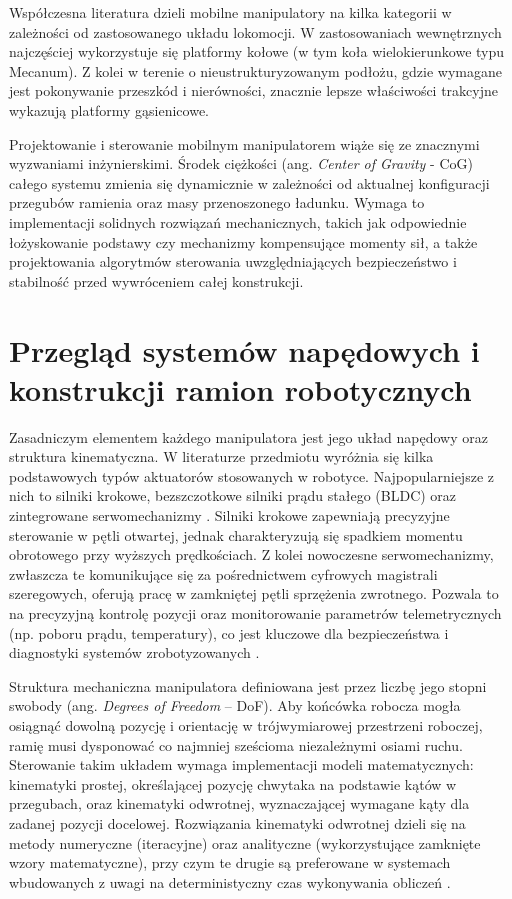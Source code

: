 \documentclass[11pt]{extreport}
\begin{document}
Współczesna literatura dzieli mobilne manipulatory na kilka kategorii w zależności od zastosowanego układu lokomocji. W zastosowaniach wewnętrznych najczęściej wykorzystuje się platformy kołowe (w tym koła wielokierunkowe typu Mecanum). Z kolei w terenie o nieustrukturyzowanym podłożu, gdzie wymagane jest pokonywanie przeszkód i nierówności, znacznie lepsze właściwości trakcyjne wykazują platformy gąsienicowe. 

Projektowanie i sterowanie mobilnym manipulatorem wiąże się ze znacznymi wyzwaniami inżynierskimi. Środek ciężkości (ang. \textit{Center of Gravity} - CoG) całego systemu zmienia się dynamicznie w zależności od aktualnej konfiguracji przegubów ramienia oraz masy przenoszonego ładunku. Wymaga to implementacji solidnych rozwiązań mechanicznych, takich jak odpowiednie łożyskowanie podstawy czy mechanizmy kompensujące momenty sił, a także projektowania algorytmów sterowania uwzględniających bezpieczeństwo i stabilność przed wywróceniem całej konstrukcji.

\section{Przegląd systemów napędowych i konstrukcji ramion robotycznych}

Zasadniczym elementem każdego manipulatora jest jego układ napędowy oraz struktura kinematyczna. W literaturze przedmiotu wyróżnia się kilka podstawowych typów aktuatorów stosowanych w robotyce. Najpopularniejsze z nich to silniki krokowe, bezszczotkowe silniki prądu stałego (BLDC) oraz zintegrowane serwomechanizmy \cite{craig2018robotics}. Silniki krokowe zapewniają precyzyjne sterowanie w pętli otwartej, jednak charakteryzują się spadkiem momentu obrotowego przy wyższych prędkościach. Z kolei nowoczesne serwomechanizmy, zwłaszcza te komunikujące się za pośrednictwem cyfrowych magistrali szeregowych, oferują pracę w zamkniętej pętli sprzężenia zwrotnego. Pozwala to na precyzyjną kontrolę pozycji oraz monitorowanie parametrów telemetrycznych (np. poboru prądu, temperatury), co jest kluczowe dla bezpieczeństwa i diagnostyki systemów zrobotyzowanych \cite{siciliano2016springer}.

Struktura mechaniczna manipulatora definiowana jest przez liczbę jego stopni swobody (ang. \textit{Degrees of Freedom} -- DoF). Aby końcówka robocza mogła osiągnąć dowolną pozycję i orientację w trójwymiarowej przestrzeni roboczej, ramię musi dysponować co najmniej sześcioma niezależnymi osiami ruchu. Sterowanie takim układem wymaga implementacji modeli matematycznych: kinematyki prostej, określającej pozycję chwytaka na podstawie kątów w przegubach, oraz kinematyki odwrotnej, wyznaczającej wymagane kąty dla zadanej pozycji docelowej. Rozwiązania kinematyki odwrotnej dzieli się na metody numeryczne (iteracyjne) oraz analityczne (wykorzystujące zamknięte wzory matematyczne), przy czym te drugie są preferowane w systemach wbudowanych z uwagi na deterministyczny czas wykonywania obliczeń \cite{craig2018robotics}.
\end{document}
